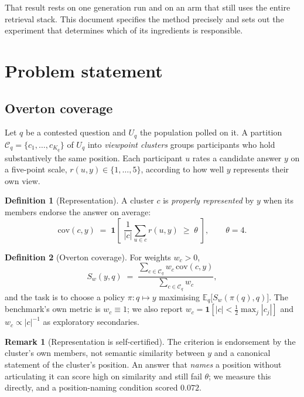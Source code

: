 \documentclass[11pt]{article}
\theoremstyle{definition}
\newtheorem{definition}{Definition}
\newtheorem{remark}{Remark}
\begin{document}
That result rests on one generation run and on an arm that still uses the entire
retrieval stack. This document specifies the method precisely and sets out the
experiment that determines which of its ingredients is responsible.

\section{Problem statement}

\subsection{Overton coverage}

Let $q$ be a contested question and $U_q$ the population polled on it. A
partition $\mathcal{C}_q = \{c_1, \ldots, c_{K_q}\}$ of $U_q$ into
\emph{viewpoint clusters} groups participants who hold substantively the same
position. Each participant $u$ rates a candidate answer $y$ on a five-point
scale, $r(u, y) \in \{1, \ldots, 5\}$, according to how well $y$ represents
their own view.

\begin{definition}[Representation]
A cluster $c$ is \emph{properly represented} by $y$ when its members endorse the
answer on average:
\[
  \mathrm{cov}(c, y) \;=\; \mathbf{1}\!\left[\; \frac{1}{|c|}
  \sum_{u \in c} r(u, y) \;\ge\; \theta \;\right], \qquad \theta = 4 .
\]
\end{definition}

\begin{definition}[Overton coverage]
For weights $w_c > 0$,
\[
  S_w(y, q) \;=\; \frac{\sum_{c \in \mathcal{C}_q} w_c \,\mathrm{cov}(c, y)}
                       {\sum_{c \in \mathcal{C}_q} w_c},
\]
and the task is to choose a policy $\pi : q \mapsto y$ maximising
$\mathbb{E}_{q}\bigl[S_w(\pi(q), q)\bigr]$. The benchmark's own metric is
$w_c \equiv 1$; we also report $w_c = \mathbf{1}[|c| < \tfrac{1}{2}\max_j |c_j|]$
and $w_c \propto |c|^{-1}$ as exploratory secondaries.
\end{definition}

\begin{remark}[Representation is self-certified]
The criterion is endorsement by the cluster's own members, not semantic
similarity between $y$ and a canonical statement of the cluster's position. An
answer that \emph{names} a position without articulating it can score high on
similarity and still fail $\theta$; we measure this directly, and a
position-naming condition scored $0.072$.
\end{remark}
\end{document}
